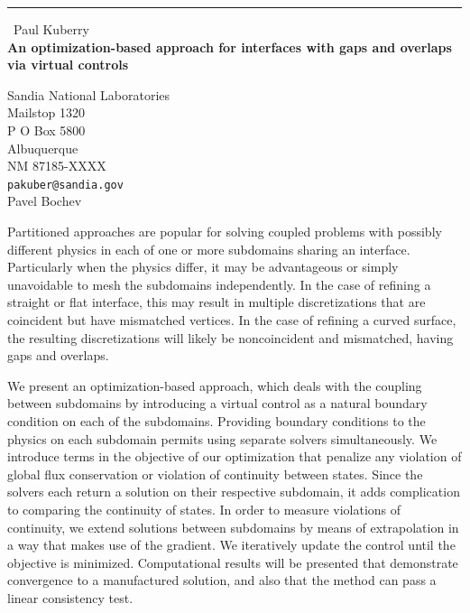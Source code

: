 \documentclass{report}
\begin{document}
\begin{center}
\rule{6in}{1pt} \
{\large Paul Kuberry \\
{\bf An optimization-based approach for interfaces with gaps and overlaps via virtual controls }}

Sandia National Laboratories \\ Mailstop 1320 \\ P O Box 5800 \\ Albuquerque \\ NM 87185-XXXX
\\
{\tt pakuber@sandia.gov}\\
Pavel Bochev\end{center}

Partitioned approaches are popular for solving coupled problems with
possibly different physics in each of one or more subdomains sharing an
interface. Particularly when the physics differ, it may be advantageous
or simply unavoidable to mesh the subdomains independently. In the case
of refining a straight or flat interface, this may result in multiple
discretizations that are coincident but have mismatched vertices. In the
case of refining a curved surface, the resulting discretizations will
likely be noncoincident and mismatched, having gaps and overlaps.

We present an optimization-based approach, which deals with the coupling
between subdomains by introducing a virtual control as a natural boundary
condition on each of the subdomains. Providing boundary conditions to the
physics on each subdomain permits using separate solvers simultaneously.
We introduce terms in the objective of our optimization that penalize any
violation of global flux conservation or violation of continuity between
states. Since the solvers each return a solution on their respective
subdomain, it adds complication to comparing the continuity of states. In
order to measure violations of continuity, we extend solutions between
subdomains by means of extrapolation in a way that makes use of the
gradient. We iteratively update the control until the objective is
minimized. Computational results will be presented that demonstrate
convergence to a manufactured solution, and also that the method can pass
a linear consistency test.
\end{document}
